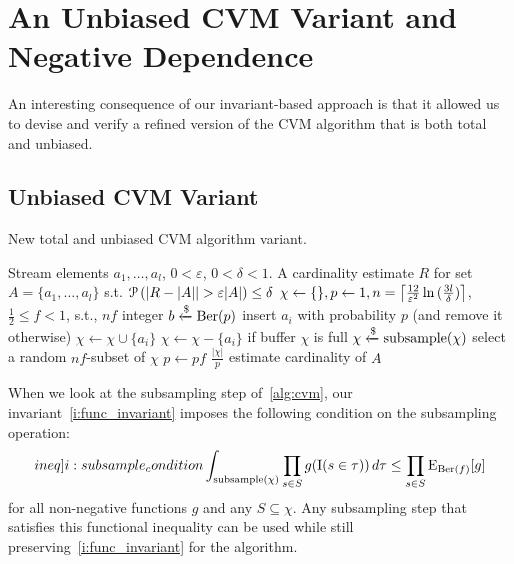 \section{An Unbiased CVM Variant and Negative Dependence\label{sec:negdep}}

An interesting consequence of our invariant-based approach is that it allowed us to devise and verify a refined version of the CVM algorithm that is both total and unbiased.

\subsection{Unbiased CVM Variant}

\begin{algorithm}[t!]
	\caption{New total and unbiased CVM algorithm variant.}\label{alg:cvm_new}
	\begin{algorithmic}[1]
  \Require Stream elements $a_1,\dots,a_l$, $0 < \varepsilon$, $0 < \delta < 1$.
  \Ensure A cardinality estimate $R$ for set $A = \{ a_1,\dots,a_l \}$ s.t. $\prob \left( |R - |A| | > \varepsilon |A| \right) \leq \delta$
  \State $\chi \gets \{\}, p \gets 1, n = \ceil*{\frac{12}{\varepsilon^2} \ln{(\frac{3l}{\delta})} }$, $\frac{1}{2} \leq f < 1$, s.t., $nf$ integer
    \State $b \getsr \Ber(p)$ \Comment insert $a_i$ with probability $p$ (and remove it otherwise)
      \State $\chi \gets \chi \cup \{a_i\}$
    \Else
      \State $\chi \gets \chi - \{a_i\}$
    \EndIf
     \Comment if buffer $\chi$ is full
      \State $\chi \getsr \mathrm{subsample}(\chi)$ \Comment select a random $nf$-subset of $\chi$
      \State $p \gets pf$
    \EndIf
  \EndFor
  \State \Return $\frac{|\chi|}{p}$ \Comment estimate cardinality of $A$
  \end{algorithmic}
\end{algorithm}%


When we look at the subsampling step of~\cref{alg:cvm}, our invariant~\cref{i:func_invariant} imposes the following condition on the subsampling operation:
\begin{equation}\label[ineq]{i:subsample_condition}
  \int_{\mathrm{subsample}(\chi)} \prod_{s \in S} g(\indicat(s \in \tau)) \, d \tau \leq \prod_{s \in S} \expect_{\Ber(f)} [g]
\end{equation}
for all non-negative functions $g$ and any $S \subseteq \chi$.
Any subsampling step that satisfies this functional inequality can be used while still preserving~\cref{i:func_invariant} for the algorithm.

